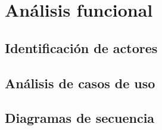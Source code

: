 \chapter{Análisis funcional}
\section{Identificación de actores}
\section{Análisis de casos de uso}
\section{Diagramas de secuencia}